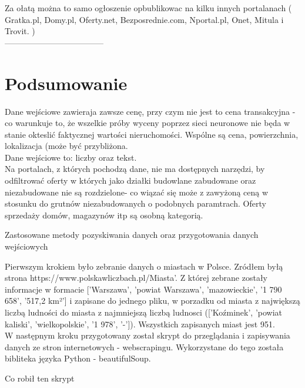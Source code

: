 \documentclass[a4paper,12pt,twoside,openany]{report}
\begin{document}
Za ołatą można to samo ogłoszenie opbublikowac na kilku innych portalanach ( Gratka.pl, Domy.pl, Oferty.net, Bezposrednie.com, Nportal.pl, Onet, Mitula i Trovit. )\\

------------------------------------
\section{Podsumowanie}

Dane wejściowe zawieraja zawsze cenę, przy czym nie jest to cena transakcyjna - co warunkuje to, że wszelkie próby wyceny poprzez sieci neuronowe nie będa w stanie okteslić faktycznej wartości nieruchomości.
Wspólne są cena, powierzchnia, lokalizacja (może być przybliżona.\\

Dane wejściowe to: liczby oraz tekst.\\


Na portalach, z których pochodzą dane, nie ma dostępnych narzędzi, by odfiltrować oferty w których jako działki budowlane zabudowane oraz niezabudowane nie są rozdzielone- co wiązać się może z zawyżoną ceną w stosunku do grutnów niezabudowanych o podobnych paramtrach.
Oferty sprzedaży domów, magazynów itp są osobną kategorią.


\huge{Zastosowane metody pozyskiwania danych oraz przygotowania danych wejściowych}

 
\normalsize 
Pierwszym krokiem było zebranie danych o miastach w Polsce.
Zródłem byłą strona https://www.polskawliczbach.pl/Miasta'. Z której zebrane zostały informacje w formacie ['Warszawa', 'powiat Warszawa', 'mazowieckie', '1 790 658', '517,2 km²']
i zapisane do jednego pliku, w porzadku od miasta z największą liczbą ludności do miasta z najmniejszą liczbą ludnosci (['Koźminek', 'powiat kaliski', 'wielkopolskie', '1 978', '-']).
Wszystkich zapisanych miast jest 951.\\

W następnym kroku przygotowany został skrypt do przeglądania i zapisywania danych ze stron internetowych - webscrapingu.
Wykorzystane do tego została bibliteka języka Python - beautifulSoup.

Co robił ten skrypt
\end{document}

